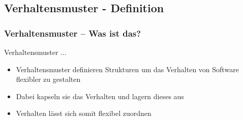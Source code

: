 \subsection{Verhaltensmuster - Definition}


\begin{frame}
	\frametitle{Verhaltensmuster -- Was ist das?}
	\begin{block}{Verhaltensmuster ...}
	\begin{itemize}
		\item Verhaltensmuster definieren Strukturen um das Verhalten von Software flexibler zu gestalten
		\item Dabei kapseln sie das Verhalten und lagern dieses aus
		\item Verhalten lässt sich somit flexibel zuordnen
	\end{itemize}
	\end{block}	
\end{frame}


%
